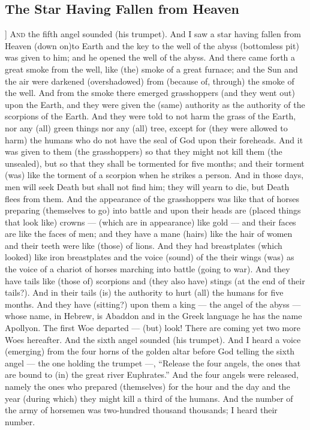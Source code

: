 \begin{pages}
\begin{Leftside}
        			\chapter{The Star Having Fallen from Heaven}
				]
		\renewcommand{\LettrineFontHook}{\Zallmanfamily}
		\lettrine[lines=3]{A}{nd} the fifth angel sounded (his trumpet). And I saw a star having fallen from Heaven (down on)to Earth and the key to the well of the abyss (bottomless pit) was given to him; and he opened the well of the abyss. And there came forth a great smoke from the well, like (the) smoke of a great furnace; and the Sun and the air were darkened (overshadowed) from (because of, through) the smoke of the well. 
		\pend
		\pstart
		And from the smoke there emerged grasshoppers (and they went out) upon the Earth, and they were given the (same) authority as the authority of the scorpions of the Earth. And they were told to not harm the grass of the Earth, nor any (all) green things nor any (all) tree, except for (they were allowed to harm) the humans who do not have the seal of God upon their foreheads. 
		\pend
		\pstart
		And it was given to them (the grasshoppers) so that they might not kill them (the unsealed), but so that they shall be tormented for five months; and their torment (was) like the torment of a scorpion when he strikes a person. And in those days, men will seek Death but shall not find him; they will yearn to die, but 	Death flees from them. 
		\pend
		\pstart
		And the appearance of the grasshoppers was like that of horses preparing (themselves to go) into battle and upon their heads are (placed things that look like) crowns — (which are in appearance) like gold — and their faces are like the faces of men; and they have a mane (hairs) like the hair of women and their teeth were like (those) of lions. And they had breastplates (which looked) like iron breastplates and the voice (sound) of the their wings (was) as the voice of a chariot of horses marching into battle (going to war). 
		\pend
		\pstart
		And they have tails like (those of) scorpions and (they also have) stings (at the end of their tails?). And in their tails (is) the authority to hurt (all) the humans for five months. And they have (sitting?) upon them a king — the angel of the abyss — whose name, in Hebrew, is Abaddon and in the Greek language he has the name Apollyon. The first Woe departed — (but) look! There are coming yet two more Woes hereafter. 
		\pend
		\pstart
		And the sixth angel sounded (his trumpet). And I heard a voice (emerging) from the four horns of the golden altar before God telling the sixth angel — the one holding the trumpet —, “Release the four angels, the ones that are bound to (in) the great river Euphrates.” And the four angels were released, namely the ones who prepared (themselves) for the hour and the day and the year (during which) they might kill a third of the humans. And the number of the army of horsemen was two-hundred thousand thousands; I heard their number.

\end{Leftside}
\end{pages}
